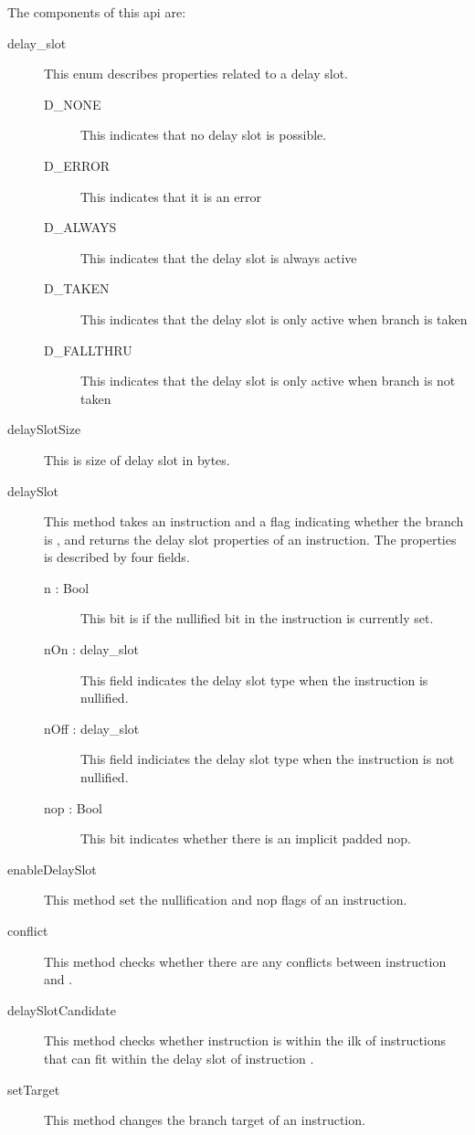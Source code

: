 The components of this api are:
\begin{description}
  \item[delay\_slot] This enum describes properties related to a 
      delay slot.
   \begin{description}
     \item[D\_NONE]   This indicates that no delay slot is possible.
     \item[D\_ERROR]  This indicates that it is an error 
     \item[D\_ALWAYS] This indicates that the delay slot is always active
     \item[D\_TAKEN]  This indicates that the 
              delay slot is only active when branch is taken
     \item[D\_FALLTHRU]  This indicates that the delay slot 
       is only active when branch is not taken 
   \end{description} 
  \item[delaySlotSize] This is size of delay slot in bytes.

  \item[delaySlot]  This method takes an instruction 
      and a flag indicating whether the branch is ,
     and returns the delay slot properties of an instruction.   The
      properties is described by four fields.
      \begin{description}
        \item[n : Bool]  This bit is if the nullified bit in the
   instruction is currently set.
        \item[nOn : delay\_slot] This field indicates the delay slot 
          type when the instruction is nullified.
        \item[nOff : delay\_slot] This field indiciates the delay slot
         type when the instruction is not nullified. 
         \item[nop  : Bool] This bit indicates whether there is an 
implicit padded nop.
      \end{description}


   \item[enableDelaySlot]
       This method set the nullification and nop flags of an instruction.

   \item[conflict] This method checks whether there are any conflicts
      between instruction  and .
   \item[delaySlotCandidate] 
       This method checks whether instruction  is within the
       ilk of instructions that can fit within the delay slot of 
       instruction .

   \item[setTarget]
       This method changes the branch target of an instruction.
\end{description}


